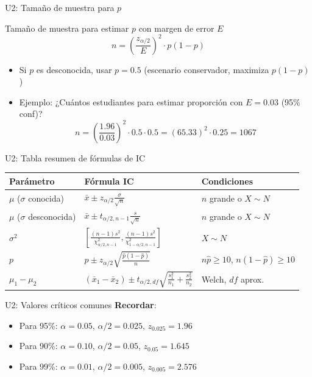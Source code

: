 \documentclass[aspectratio=169, 11pt]{beamer}
\begin{document}
\begin{frame}{U2: Tamaño de muestra para $p$}
\begin{block}{Tamaño de muestra para estimar $p$ con margen de error $E$}
$$n = \left(\frac{z_{\alpha/2}}{E}\right)^2 \cdot p(1-p)$$
\begin{itemize}
\item Si $p$ es desconocida, usar $p = 0.5$ (escenario conservador, maximiza $p(1-p)$)
\item Ejemplo: ¿Cuántos estudiantes para estimar proporción con $E = 0.03$ (95\% conf)?
  $$n = \left(\frac{1.96}{0.03}\right)^2 \cdot 0.5 \cdot 0.5 = (65.33)^2 \cdot 0.25 = 1067$$
\end{itemize}
\end{block}
\end{frame}

\begin{frame}{U2: Tabla resumen de fórmulas de IC}
\small
\begin{center}
\renewcommand{\arraystretch}{1.4}
\begin{tabular}{lll}
\toprule
\textbf{Parámetro} & \textbf{Fórmula IC} & \textbf{Condiciones} \\
\midrule
$\mu$ ($\sigma$ conocida) & $\bar{x} \pm z_{\alpha/2} \frac{\sigma}{\sqrt{n}}$ & $n$ grande o $X \sim N$ \\
$\mu$ ($\sigma$ desconocida) & $\bar{x} \pm t_{\alpha/2, n-1} \frac{s}{\sqrt{n}}$ & $n$ grande o $X \sim N$ \\
$\sigma^2$ & $\left[\frac{(n-1)s^2}{\chi^2_{\alpha/2, n-1}}, \frac{(n-1)s^2}{\chi^2_{1-\alpha/2, n-1}}\right]$ & $X \sim N$ \\
$p$ & $\hat{p} \pm z_{\alpha/2} \sqrt{\frac{\hat{p}(1-\hat{p})}{n}}$ & $n\hat{p} \geq 10$, $n(1-\hat{p}) \geq 10$ \\
$\mu_1 - \mu_2$ & $(\bar{x}_1 - \bar{x}_2) \pm t_{\alpha/2, df} \sqrt{\frac{s_1^2}{n_1} + \frac{s_2^2}{n_2}}$ & Welch, $df$ aprox. \\
\bottomrule
\end{tabular}
\end{center}
\end{frame}

\begin{frame}{U2: Valores críticos comunes}
\textbf{Recordar}:
\begin{itemize}
\item Para 95\%: $\alpha = 0.05$, $\alpha/2 = 0.025$, $z_{0.025} = 1.96$
\item Para 90\%: $\alpha = 0.10$, $\alpha/2 = 0.05$, $z_{0.05} = 1.645$
\item Para 99\%: $\alpha = 0.01$, $\alpha/2 = 0.005$, $z_{0.005} = 2.576$
\end{itemize}
\end{frame}
\end{document}
